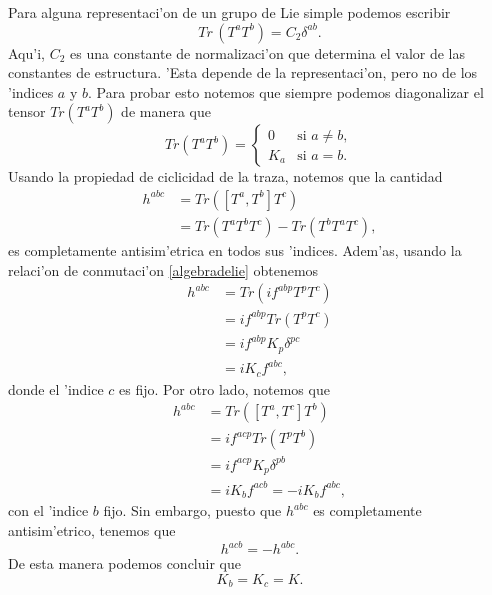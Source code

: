 Para alguna representaci'on de un grupo de Lie simple podemos escribir 
\begin{equation}\label{C2}
Tr\, (T^a T^b)=C_2 \delta^{ab}.
\end{equation}
Aqu'i, $C_2$ es una constante de normalizaci'on que determina el valor de las constantes de estructura. 'Esta depende de la representaci'on, pero no de los 'indices $a$ y $b$. Para probar esto notemos que siempre podemos diagonalizar el tensor $Tr(T^aT^b)$ de manera que
\begin{equation}
Tr(T^{a}T^{b})=\begin{cases}
0 & \text{si }a\neq b,\\
K_{a} & \text{si }a=b.
\end{cases}
\end{equation}
Usando la propiedad de ciclicidad de la traza, notemos que la cantidad
\begin{equation}
\begin{aligned}
h^{abc}&=Tr([T^a,T^b]T^c) \\
&=Tr(T^aT^bT^c)-Tr(T^bT^aT^c),
\end{aligned}
\end{equation}
es completamente antisim'etrica en todos sus 'indices. Adem'as, usando la relaci'on de conmutaci'on \eqref{algebradelie} obtenemos
\begin{equation}
\begin{aligned}
h^{abc}&=Tr(if^{abp}T^pT^c) \\
&=if^{abp}Tr(T^pT^c) \\
&=if^{abp}K_p \delta^{pc} \\
&=iK_c f^{abc},
\end{aligned}
\end{equation}
donde el 'indice $c$ es fijo. Por otro lado, notemos que
\begin{equation}
\begin{aligned}
h^{abc}&=Tr([T^a,T^c]T^b) \\
&=if^{acp}Tr(T^pT^b) \\
&=if^{acp}K_p \delta^{pb} \\
&=iK_b f^{acb}=-iK_bf^{abc},
\end{aligned}
\end{equation}
con el 'indice $b$ fijo. Sin embargo, puesto que $h^{abc}$ es completamente antisim'etrico, tenemos que
\begin{equation}
h^{acb}=-h^{abc}.
\end{equation}
De esta manera podemos concluir que
\begin{equation}
K_b=K_c=K.
\end{equation}
